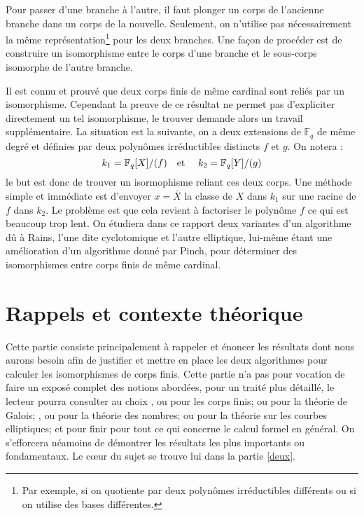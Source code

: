 \documentclass[a4paper]{article} %
\numberwithin{section}{part}
\numberwithin{equation}{section}
\newcommand\GF[1]{\mathbb{F}_{#1}}
\newcommand\etmath{\textup{\quad et \quad}}
\begin{document}
Pour passer d'une branche à l'autre, il faut plonger un corps de l'ancienne
branche dans un corps de la nouvelle. Seulement, on n'utilise pas nécessairement
la même représentation\footnote{Par exemple, si on quotiente par deux polynômes
irréductibles différents ou si on utilise des bases différentes.} pour les deux 
branches. Une façon de procéder est de construire un isomorphisme entre le corps
d'une branche et le sous-corps isomorphe de l'autre branche.\par
Il est connu et prouvé que deux corps finis de même cardinal sont reliés par
un isomorphisme. Cependant la preuve de ce résultat ne permet pas d'expliciter
directement un tel isomorphisme, le trouver demande alors un travail 
supplémentaire. La situation est la suivante, on a deux extensions de 
$\GF{q}$ de même degré et définies par deux polynômes irréductibles distincts 
$f$ et $g$. On notera :
\[k_1=\GF{q}[X]/(f)\etmath k_2=\GF{q}[Y]/(g)\]
le but est donc de trouver un isormophisme reliant ces deux corps. 
Une méthode simple et immédiate est d'envoyer $x = \bar{X}$ la classe de $X$
dans $k_1$ sur une racine de $f$ dans $k_2$. Le problème est que cela revient à 
factoriser le polynôme $f$ ce qui est beaucoup trop lent. On étudiera dans ce
rapport deux variantes d'un algorithme dû à Rains\cite{Rai}, l'une dite 
cyclotomique et l'autre elliptique, lui-même étant une amélioration d'un 
algorithme donné par Pinch\cite{Pin}, pour déterminer des isomorphismes entre 
corps finis de même cardinal.

\newpage
\tableofcontents
\newpage

\part{Rappels et contexte théorique}
\label{un}

Cette partie consiste principalement à rappeler et énoncer les résultats dont
nous aurons besoin afin de justifier et mettre en place les deux algorithmes 
pour calculer les isomorphismes de corps finis. Cette partie n'a pas pour 
vocation de faire un exposé complet des notions abordées, pour un traité plus 
détaillé, le lecteur pourra consulter au choix \cite{LiNi1}, \cite{MuPa} ou 
\cite[chap.~III]{Per} pour les corps finis;
\cite[chap.~VI]{Sam} ou \cite{Esc} pour la théorie de Galois; \cite{Sam}, 
\cite{Was1} ou \cite{Lan} pour la théorie des nombres; \cite{Sil} ou 
\cite{Was2} pour la théorie sur les courbes elliptiques; et pour finir 
\cite{GaGe} pour tout ce qui concerne le calcul formel en général. On 
s'efforcera néamoins de démontrer les résultats les plus importants ou 
fondamentaux. Le c\oe ur du sujet se trouve lui dans la partie \ref{deux}.
\end{document}
